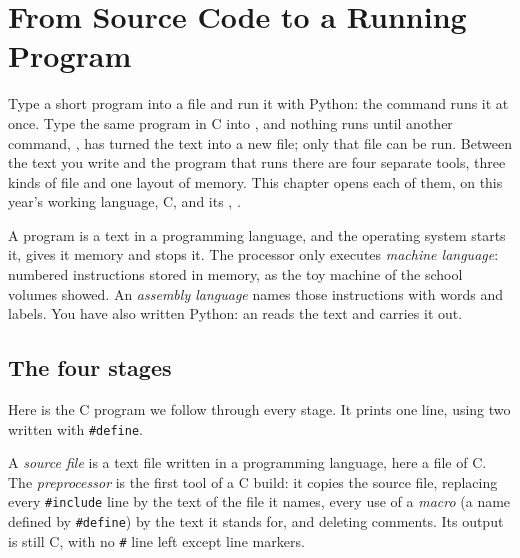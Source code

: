 \chapter{From Source Code to a Running Program}\label{ch:b1:compilation-pipeline}

Type a short program into a file and run it with Python: the command  runs it
at once. Type the same program in C into , and nothing runs until another command,
, has turned the text into a new file; only that file can be run. Between the text
you write and the program that runs there are four separate tools, three kinds of file and one layout of
memory. This chapter opens each of them, on this year's working language, C, and its , .

\begin{recall}
A program is a text in a programming language, and the operating system starts it, gives it memory and
stops it. The processor only executes \emph{machine language}: numbered instructions stored in memory, as
the toy machine of the school volumes showed. An \emph{assembly language} names those instructions with
words and labels. You have also written Python: an  reads the text and carries it out.
\end{recall}

\section{The four stages}\label{sec:b1:compilation-pipeline:stages}

Here is the C program we follow through every stage. It prints one line, using two \emph{} written with
\texttt{\#define}.

\label{lst:b1:compilation-pipeline:hello}


\begin{definition}\label{def:b1:compilation-pipeline:source-file}\label{def:b1:compilation-pipeline:preprocessor}
A \emph{source file} is a text file written in a programming language, here a  file
of C. The \emph{preprocessor} is the first tool of a C build: it copies the source file,
replacing every \texttt{\#include} line by the text of the file it names, every use of a \emph{macro} (a name defined by \texttt{\#define}) by the text it stands for, and deleting comments. Its output is still C,
with no \texttt{\#} line left except line markers.
\end{definition}

